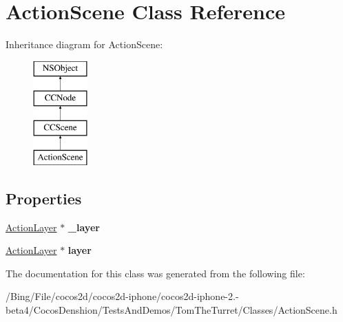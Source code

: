 \hypertarget{interface_action_scene}{\section{Action\-Scene Class Reference}
\label{interface_action_scene}
}
Inheritance diagram for Action\-Scene\-:\begin{figure}[H]
\begin{center}
\leavevmode
\includegraphics[height=4.000000cm]{interface_action_scene}
\end{center}
\end{figure}
\subsection*{Properties}
\begin{DoxyCompactItemize}
\item 
\hypertarget{interface_action_scene_aa56e0e1fed8bb357e505f57efddef2ff}{\hyperlink{interface_action_layer}{Action\-Layer} $\ast$ {\bfseries \-\_\-layer}}\label{interface_action_scene_aa56e0e1fed8bb357e505f57efddef2ff}

\item 
\hypertarget{interface_action_scene_a123e903157f3ed48518ddd07779ba1ce}{\hyperlink{interface_action_layer}{Action\-Layer} $\ast$ {\bfseries layer}}\label{interface_action_scene_a123e903157f3ed48518ddd07779ba1ce}

\end{DoxyCompactItemize}


The documentation for this class was generated from the following file\-:\begin{DoxyCompactItemize}
\item 
/\-Bing/\-File/cocos2d/cocos2d-\/iphone/cocos2d-\/iphone-\/2.-\/beta4/\-Cocos\-Denshion/\-Tests\-And\-Demos/\-Tom\-The\-Turret/\-Classes/Action\-Scene.\-h\end{DoxyCompactItemize}
